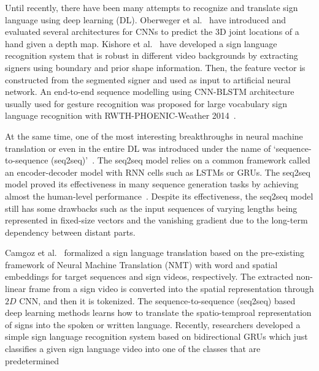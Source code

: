 \documentclass[10pt,twocolumn,letterpaper]{article}
\begin{document}
Until recently, there have been many attempts to recognize and translate sign language using deep learning (DL). Oberweger et al.~\cite{OberwegerWL15} have introduced and evaluated several architectures for CNNs to predict the 3D joint locations of a hand given a depth map. Kishore et al.~\cite{KishoreSK14} have developed a sign language recognition system that is robust in different video backgrounds by extracting signers using boundary and prior shape information. Then, the feature vector is constructed from the segmented signer and used as input to artificial neural network. An end-to-end sequence modelling using CNN-BLSTM architecture usually used for gesture recognition was proposed for large vocabulary sign language recognition with RWTH-PHOENIC-Weather 2014~\cite{koller2017re}.

At the same time, one of the most interesting breakthroughs in neural machine translation or even in the entire DL was introduced under the name of `sequence-to-sequence (seq2seq)'~\cite{SutskeverVL14}. The seq2seq model relies on a common framework called an encoder-decoder model with RNN cells such as LSTMs or GRUs. The seq2seq model proved its effectiveness in many sequence generation tasks by achieving almost the human-level performance~\cite{SutskeverVL14}. Despite its effectiveness, the seq2seq model still has some drawbacks such as the input sequences of varying lengths being represented in fixed-size vectors and the vanishing gradient due to the long-term dependency between distant parts.

Camgoz et al.~\cite{CamgozHKNB18} formalized a sign language translation based on the pre-existing framework of Neural Machine Translation (NMT) with word and spatial embeddings for target sequences and sign videos, respectively.
The extracted non-linear frame from a sign video is converted into the spatial representation through $2D$ CNN, and then it is tokenized.
The sequence-to-sequence (seq2seq) based deep learning methods learns how to translate the spatio-temproal representation of signs into the spoken or written language.
Recently, researchers developed a simple sign language recognition system based on bidirectional GRUs which just classifies a given sign language video into one of the classes that are predetermined~\cite{KoSJ18}
\end{document}
